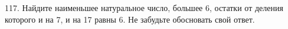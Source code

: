117. Найдите наименьшее натуральное число, большее 6, остатки от деления которого и на 7, и на 17 равны 6. Не забудьте обосновать свой ответ.\\

